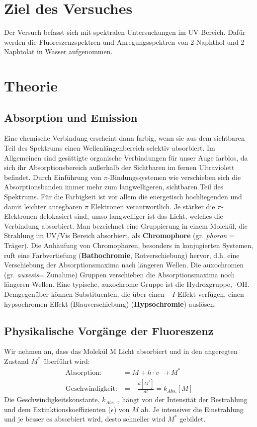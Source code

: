 \documentclass[12pt]{article}
\begin{document}
\section{Ziel des Versuches}
Der Versuch befasst sich mit spektralen Untersuchungen im UV-Bereich. Dafür werden die Fluoreszenzspektren und Anregungsspektren von 2-Naphthol und 2-Naphtolat in Wasser aufgenommen.
\section {Theorie}
\subsection{Absorption und Emission\supercite{og}}
 Eine chemische Verbindung erscheint dann farbig, wenn sie aus dem sichtbaren Teil des Spektrums einen Wellenlängenbereich selektiv absorbiert.
Im Allgemeinen sind gesättigte organische Verbindungen für unser Auge farblos, da sich ihr Absorptionsbereich außerhalb der Sichtbaren im fernen Ultraviolett
befindet. Durch Einführung von $\pi$-Bindungssystemen wie verschieben sich
die Absorptionsbanden immer mehr zum langwelligeren, sichtbaren Teil des Spektrums.
Für die Farbigkeit ist vor allem die energetisch hochliegenden und damit leichter anregbaren $\pi$ Elektronen verantwortlich.
Je stärker die $\pi$-Elektronen delokasiert sind, umso langwelliger ist das Licht, welches die Verbindung absorbiert.
Man bezeichnet eine Gruppierung in einem Molekül, die Strahlung im UV/Vis Bereich absorbiert, als \textbf{Chromophore} (gr. \textit{phoron} = Träger). Die Anhäufung von Chromophoren,
besonders in konjugierten Systemen, ruft eine Farbvertiefung (\textbf{Bathochromie}, Rotverschiebung) hervor, d.h. eine Verschiebung der Absorptionsmaxima nach längeren Wellen.
Die auxochromen (gr. \textit{auxesis}= Zunahme) Gruppen verschieben die Absorptionsmaxima noch längeren Wellen. Eine typische, auxochrome Gruppe ist die Hydroxgruppe,
-OH.
Demgegenüber können Substituenten, die über einen $-I$-Effekt verfügen, einen hypsochromen Effekt (Blauverschiebung) (\textbf{Hypsochromie}) auslösen.

\subsection{Physikalische Vorgänge der Fluoreszenz\supercite{harris}}
Wir nehmen an, dass das Molekül M Licht absorbiert und in den angeregten Zustand $M^*$
überführt wird:
\begin{align*}
 \text{Absorption:} &= M + h \cdot v \, \rightarrow M^*\\
 \text{Geschwindigkeit:} &= - \frac{d[M^*]}{dt} = k _{Abs.} [M]
\end{align*}
Die Geschwindigkeitskonstante, $k_{Abs.}$ , hängt von der Intensität der Bestrahlung und
dem Extinktionskoeffizienten ($\epsilon$) von $M$ ab. Je intensiver die Einstrahlung und je besser es
absorbiert wird, desto schneller wird $M^*$ gebildet.
\end{document}
